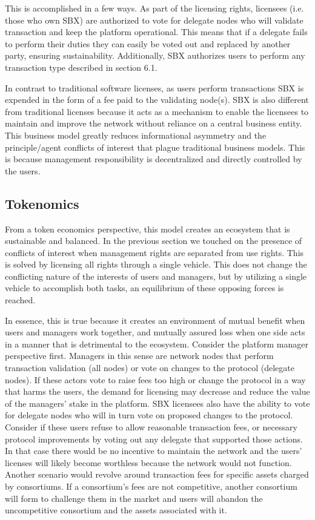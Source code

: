 \documentclass[12pt]{article}
\begin{document}
This is accomplished in a few ways. As part of the licensing rights, licensees (i.e. those who own SBX) are authorized to vote for delegate nodes who will validate transaction and keep the platform operational. This means that if a delegate fails to perform their duties they can easily be voted out and replaced by another party, ensuring sustainability. Additionally, SBX authorizes users to perform any transaction type described in section 6.1.

In contrast to traditional software licenses, as users perform transactions SBX is expended in the form of a fee paid to the validating node(s). SBX is also different from traditional licenses because it acts as a mechanism to enable the licensees to maintain and improve the network without reliance on a central business entity. This business model greatly reduces informational asymmetry and the principle/agent conflicts of interest that plague traditional business models. This is because management responsibility is decentralized and directly controlled by the users.


\subsection{Tokenomics}
From a token economics perspective, this model creates an ecosystem that is sustainable and balanced. In the previous section we touched on the presence of conflicts of interest when management rights are separated from use rights. This is solved by licensing all rights through a single vehicle. This does not change the conflicting nature of the interests of users and managers, but by utilizing a single vehicle to accomplish both tasks, an equilibrium of these opposing forces is reached.

In essence, this is true because it creates an environment of mutual benefit when users and managers work together, 
and mutually assured loss when one side acts in a manner that is detrimental to the ecosystem. Consider the platform 
manager perspective first. Managers in this sense are network nodes that perform transaction validation (all nodes) or vote 
on changes to the protocol (delegate nodes). If these actors vote to raise fees too high or change the protocol in a way 
that harms the users, the demand for licensing may decrease and reduce the value of the managers’ stake in the platform. 
SBX licensees also have the ability to vote for delegate nodes who will in turn vote on proposed changes to the protocol. 
Consider if these users refuse to allow reasonable transaction fees, or necessary protocol improvements by voting out any 
delegate that supported those actions. In that case there would be no incentive to maintain the network and the users’ licenses 
will likely become worthless because the network would not function. Another scenario would revolve around transaction fees for specific 
assets charged by consortiums. If a consortium’s fees are not competitive, another consortium will form to challenge them in the 
market and users will abandon the uncompetitive consortium and the assets associated with it.
\end{document}

